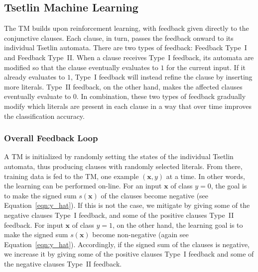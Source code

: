 \documentclass[letterpaper]{article}
\begin{document}
\subsection{Tsetlin Machine Learning}
The TM builds upon reinforcement learning, with feedback given directly to the conjunctive clauses. Each clause, in turn, passes the feedback onward to its individual Tsetlin automata. There are two types of feedback: Feedback Type~I and Feedback Type~II. When a clause receives Type~I feedback, its automata are modified so that the clause eventually evaluates to $1$ for the current input. If it already evaluates to $1$, Type~I feedback will instead refine the clause by inserting more literals. Type~II feedback, on the other hand, makes the affected clauses eventually evaluate to $0$. In combination, these two types of feedback gradually modify which literals are present in each clause in a way that over time improves the classification accuracy.

\subsubsection{Overall Feedback Loop}
A TM is initialized by randomly setting the states of the individual Tsetlin automata, thus producing clauses with randomly selected literals. From there, training data is fed to the TM, one example $(\mathbf x, y)$ at a time. In other words, the learning can be performed on-line. For an input $\mathbf x$ of class $y=0$, the goal is to make the signed sum $s(\mathbf x)$ of the clauses become negative (see Equation~\ref{eqn:y_hat}). If this is not the case, we mitigate by giving some of the negative clauses Type~I feedback, and some of the positive clauses Type~II feedback. For input $\mathbf x$ of class $y=1$, on the other hand, the learning goal is to make the signed sum $s(\mathbf x)$ become non-negative (again see Equation~\ref{eqn:y_hat}). Accordingly, if the signed sum of the clauses is negative, we increase it by giving some of the positive clauses Type~I feedback and some of the negative clauses Type~II feedback.
\end{document}
